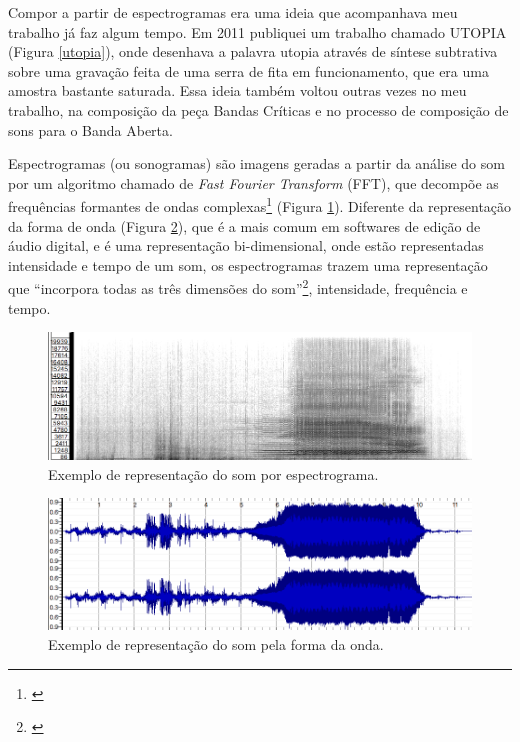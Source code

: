 Compor a partir de espectrogramas era uma ideia que acompanhava meu trabalho já faz algum tempo. Em 2011 publiquei um trabalho chamado UTOPIA (Figura \ref{utopia}), onde desenhava a palavra utopia através de síntese subtrativa sobre uma gravação feita de uma serra de fita em funcionamento, que era uma amostra bastante saturada. Essa ideia também voltou outras vezes no meu trabalho, na composição da peça Bandas Críticas e no processo de composição de sons para o Banda Aberta. 

Espectrogramas (ou sonogramas) são imagens geradas a partir da análise do som por um algoritmo chamado de \emph{Fast Fourier Transform} (FFT), que decompõe as frequências formantes de ondas complexas\footnote{\cite[55]{Roads}} (Figura \ref{specrep}). Diferente da representação da forma de onda (Figura \ref{wave}), que é a mais comum em softwares de edição de áudio digital, e é uma representação bi-dimensional, onde estão representadas intensidade e tempo de um som, os espectrogramas trazem uma representação que ``incorpora todas as três dimensões do som''\footnote{\cite{Schafer2011}}, intensidade, frequência e tempo. 


\begin{figure}
\includegraphics[width=1\textwidth]{pictures/cap4/exemplospec}
\caption{\label{utopia}Exemplo de representação do som por espectrograma. }
\label{specrep}
\end{figure}

\begin{figure}
\includegraphics[width=1\textwidth]{pictures/cap4/exemplowave}
\caption{\label{utopia}Exemplo de representação do som pela forma da onda. }
\label{wave}
\end{figure}

